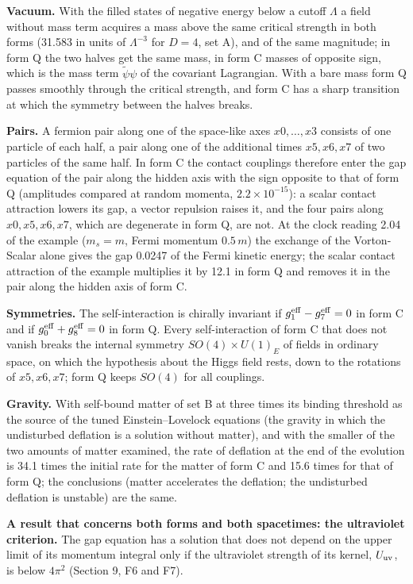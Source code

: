 \documentclass[
  10pt,
]{article}
\begin{document}
\textbf{Vacuum.} With the filled states of negative energy below a
cutoff \(\Lambda\) a field without mass term acquires a mass above the
same critical strength in both forms (31.583 in units of
\(\Lambda^{-3}\) for \(D=4\), set A), and of the same magnitude; in form
Q the two halves get the same mass, in form C masses of opposite sign,
which is the mass term \(\tilde\psi\psi\) of the covariant Lagrangian.
With a bare mass form Q passes smoothly through the critical strength,
and form C has a sharp transition at which the symmetry between the
halves breaks.

\textbf{Pairs.} A fermion pair along one of the space-like axes
\(x0,\dots,x3\) consists of one particle of each half, a pair along one
of the additional times \(x5,x6,x7\) of two particles of the same half.
In form C the contact couplings therefore enter the gap equation of the
pair along the hidden axis with the sign opposite to that of form Q
(amplitudes compared at random momenta, \(2.2\times10^{-15}\)): a scalar
contact attraction lowers its gap, a vector repulsion raises it, and the
four pairs along \(x0,x5,x6,x7\), which are degenerate in form Q, are
not. At the clock reading 2.04 of the example (\(m_s=m\), Fermi momentum
\(0.5\,m\)) the exchange of the Vorton-Scalar alone gives the gap 0.0247
of the Fermi kinetic energy; the scalar contact attraction of the
example multiplies it by 12.1 in form Q and removes it in the pair along
the hidden axis of form C.

\textbf{Symmetries.} The self-interaction is chirally invariant if
\(g_1^{\rm eff}-g_7^{\rm eff}=0\) in form C and if
\(g_0^{\rm eff}+g_8^{\rm eff}=0\) in form Q. Every self-interaction of
form C that does not vanish breaks the internal symmetry
\(SO(4)\times U(1)_E\) of fields in ordinary space, on which the
hypothesis about the Higgs field rests, down to the rotations of
\(x5,x6,x7\); form Q keeps \(SO(4)\) for all couplings.

\textbf{Gravity.} With self-bound matter of set B at three times its
binding threshold as the source of the tuned Einstein--Lovelock
equations (the gravity in which the undisturbed deflation is a solution
without matter), and with the smaller of the two amounts of matter
examined, the rate of deflation at the end of the evolution is 34.1
times the initial rate for the matter of form C and 15.6 times for that
of form Q; the conclusions (matter accelerates the deflation; the
undisturbed deflation is unstable) are the same.

\textbf{A result that concerns both forms and both spacetimes: the
ultraviolet criterion.} The gap equation has a solution that does not
depend on the upper limit of its momentum integral only if the
ultraviolet strength of its kernel, \(U_{\rm uv}\), is below \(4\pi^2\)
(Section 9, F6 and F7).
\end{document}
